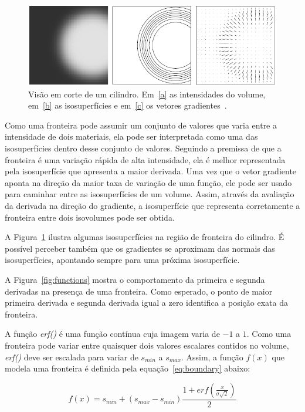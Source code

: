 \begin{figure}[h]
	\centering
	\includegraphics[width=1\textwidth]{images/grad}
	\caption{Visão em corte de um cilindro. Em~\ref{a} as intensidades do volume, em~\ref{b} as isosuperfícies e em~\ref{c} os vetores gradientes~\cite{gordon}.}
	\label{fig:grad}
\end{figure}

	Como uma fronteira pode assumir um conjunto de valores que varia entre a intensidade de dois materiais, ela pode ser interpretada como uma das isosuperfícies dentro desse conjunto de valores. Seguindo a premissa de que a fronteira é uma variação rápida de alta intensidade, ela é melhor representada pela isosuperfície que apresenta a maior derivada. Uma vez que o vetor gradiente aponta na direção da maior taxa de variação de uma função, ele pode ser usado para caminhar entre as isosuperfícies de um volume. Assim, através da avaliação da derivada na direção do gradiente, a isosuperfície que representa corretamente a fronteira entre dois isovolumes pode ser obtida.
	
	A Figura~\ref{fig:grad} ilustra algumas isosuperfícies na região de fronteira do cilindro. É possível perceber também que os gradientes se aproximam das normais das isosuperfícies, apontando sempre para uma próxima isosuperfície.
	
	A Figura~\ref{fig:functions} mostra o comportamento da primeira e segunda derivadas na presença de uma fronteira. Como esperado, o ponto de maior primeira derivada e segunda derivada igual a zero identifica a posição exata da fronteira.
	
	A função \textit{erf()} é uma função contínua cuja imagem varia de $-1$ a $1$. Como uma fronteira pode variar entre quaisquer dois valores escalares contidos no volume, \textit{erf()} deve ser escalada para variar de $s_{min}$ a $s_{max}$. Assim, a função $f(x)$ que modela uma fronteira é definida pela equação~\eqref{eq:boundary} abaixo:

\begin{equation} \label{eq:boundary}
	f(x) = s_{min} + (s_{max} - s_{min}) \frac{1 + erf(\frac{x}{\sigma\sqrt{2}})}{2}
\end{equation}
	
